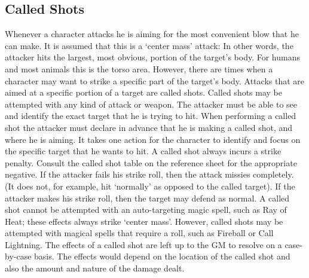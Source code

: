 \documentclass[twoside]{book}
\begin{document}
    

\subsection{Called Shots}
      Whenever a character attacks he is aiming for the
               most convenient blow that he can make. It is assumed that
               this is a `center mass' attack: In other
               words, the attacker hits the largest, most obvious,
               portion of the target's body. For humans and most
               animals this is the torso area.   However, there are times when a character may want
               to strike a specific part of the target's body.
               Attacks that are aimed at a specific portion of a target
               are called shots. Called shots may be attempted with any
               kind of attack or weapon. The attacker must be able to see
               and identify the exact target that he is trying to hit.
                 When performing a called shot the attacker must
               declare in advance that he is making a called shot, and
               where he is aiming. It takes one action for the character
               to identify and focus on the specific target that he wants
               to hit. A called shot always incurs a strike penalty.
               Consult the called shot table on the reference sheet for
               the appropriate negative. If the attacker fails his strike
               roll, then the attack missies completely. (It does not,
               for example, hit `normally' as opposed to the
               called target). If the attacker makes his strike roll,
               then the target may defend as normal.   A called shot cannot be attempted with an
               auto-targeting magic spell, such as Ray of Heat; these
               effects always strike `center mass'. However,
               called shots may be attempted with magical spells that
               require a roll, such as Fireball or Call Lightning.
                 The effects of a called shot are left up to the GM
               to resolve on a case-by-case basis. The effects would
               depend on the location of the called shot and also the
               amount and nature of the damage dealt. 
  

  
\end{document}
